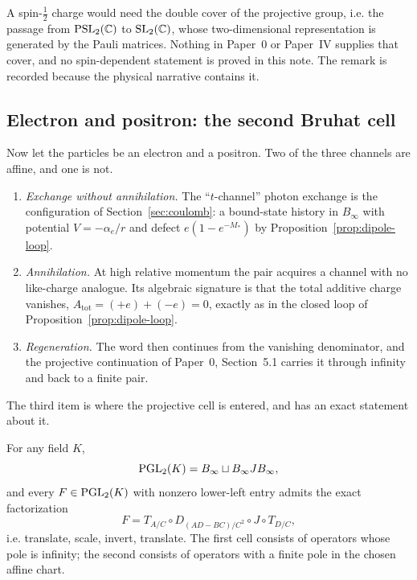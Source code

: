 \begin{remark}[On spin]
\label{rem:spin}
A spin-$\tfrac12$ charge would need the double cover of the projective group, i.e.
the passage from $\operatorname{PSL}_2(\mathbb{C})$ to $\operatorname{SL}_2(\mathbb{C})$, whose two-dimensional
representation is generated by the Pauli matrices.  Nothing in Paper~0 or
Paper~IV supplies that cover, and no spin-dependent statement is proved in this
note.  The remark is recorded because the physical narrative contains it.
\end{remark}

\subsection{Electron and positron: the second Bruhat cell}

Now let the particles be an electron and a positron.  Two of the three channels
are affine, and one is not.

\begin{enumerate}[label=(\roman*)]
  \item \emph{Exchange without annihilation.}  The ``$t$-channel'' photon
  exchange is the configuration of Section~\ref{sec:coulomb}: a bound-state
  history in $B_\infty$ with potential $V=-\alpha_e/r$ and defect
  $e(1-e^{-M_*})$ by Proposition~\ref{prop:dipole-loop}.
  \item \emph{Annihilation.}  At high relative momentum the pair acquires a
  channel with no like-charge analogue.  Its algebraic signature is that the
  total additive charge vanishes, $A_{\mathrm{tot}}=(+e)+(-e)=0$, exactly as in
  the closed loop of Proposition~\ref{prop:dipole-loop}.
  \item \emph{Regeneration.}  The word then continues from the vanishing
  denominator, and the projective continuation of Paper~0, Section~5.1 carries
  it through infinity and back to a finite pair.
\end{enumerate}

The third item is where the projective cell is entered, and \AEG{} has an exact
statement about it.

\begin{theorem}
\label{thm:bruhat}
For any field $K$,
\begin{equation}\label{eq:bruhat}
  \operatorname{PGL}_2(K)=B_\infty\sqcup B_\infty J B_\infty,
\end{equation}
and every $F\in\operatorname{PGL}_2(K)$ with nonzero lower-left entry admits the exact
factorization
\begin{equation}\label{eq:factorization}
  F=T_{A/C}\circ D_{(AD-BC)/C^{2}}\circ J\circ T_{D/C},
\end{equation}
i.e. translate, scale, invert, translate.  The first cell consists of operators
whose pole is infinity; the second consists of operators with a finite pole in
the chosen affine chart.
\end{theorem}

